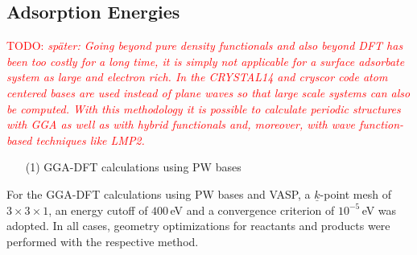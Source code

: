 \documentclass[11pt,DIV=13,BCOR=5mm,a4paper,headinclude]{scrbook}
\newcommand\todo[1]{\textcolor{red}{TODO: \textit{{#1}}}}
\renewcommand{\vec}[1]{\underline{#1}}
\begin{document}

\subsection{Adsorption Energies}\label{sec:eads_crystal}
\todo{später: Going beyond pure density functionals and also beyond DFT has been too costly for a long time, it is simply not applicable for a surface adsorbate system as large and electron rich.
In the CRYSTAL14\cite{crystal14} and cryscor\cite{cryscor} code atom centered bases are used instead of plane waves so that large scale systems can also be computed.
With this methodology it is possible to calculate periodic structures with GGA as well as with hybrid functionals and, moreover, with wave function-based techniques like LMP2.}\\
\begin{enumerate}
 \item[(1)] GGA-DFT calculations using PW bases
\end{enumerate}
For the GGA-DFT calculations using PW bases and VASP, a $\vec{k}$-point mesh of $3\times 3\times 1$, an energy cutoff of $400\,$eV and a convergence criterion of $10^{-5}\,$eV was adopted.
In all cases, geometry optimizations for reactants and products were performed with the respective method.
\end{document}
